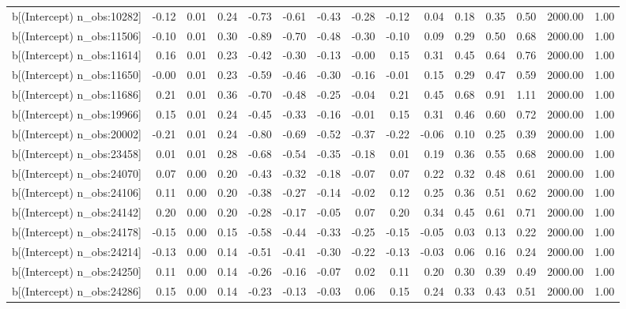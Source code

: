 \begin{table}[ht]
\begin{tabular}{rrrrrrrrrrrrrrr}
  b[(Intercept) n\_obs:10282] & -0.12 & 0.01 & 0.24 & -0.73 & -0.61 & -0.43 & -0.28 & -0.12 & 0.04 & 0.18 & 0.35 & 0.50 & 2000.00 & 1.00 \\ 
  b[(Intercept) n\_obs:11506] & -0.10 & 0.01 & 0.30 & -0.89 & -0.70 & -0.48 & -0.30 & -0.10 & 0.09 & 0.29 & 0.50 & 0.68 & 2000.00 & 1.00 \\ 
  b[(Intercept) n\_obs:11614] & 0.16 & 0.01 & 0.23 & -0.42 & -0.30 & -0.13 & -0.00 & 0.15 & 0.31 & 0.45 & 0.64 & 0.76 & 2000.00 & 1.00 \\ 
  b[(Intercept) n\_obs:11650] & -0.00 & 0.01 & 0.23 & -0.59 & -0.46 & -0.30 & -0.16 & -0.01 & 0.15 & 0.29 & 0.47 & 0.59 & 2000.00 & 1.00 \\ 
  b[(Intercept) n\_obs:11686] & 0.21 & 0.01 & 0.36 & -0.70 & -0.48 & -0.25 & -0.04 & 0.21 & 0.45 & 0.68 & 0.91 & 1.11 & 2000.00 & 1.00 \\ 
  b[(Intercept) n\_obs:19966] & 0.15 & 0.01 & 0.24 & -0.45 & -0.33 & -0.16 & -0.01 & 0.15 & 0.31 & 0.46 & 0.60 & 0.72 & 2000.00 & 1.00 \\ 
  b[(Intercept) n\_obs:20002] & -0.21 & 0.01 & 0.24 & -0.80 & -0.69 & -0.52 & -0.37 & -0.22 & -0.06 & 0.10 & 0.25 & 0.39 & 2000.00 & 1.00 \\ 
  b[(Intercept) n\_obs:23458] & 0.01 & 0.01 & 0.28 & -0.68 & -0.54 & -0.35 & -0.18 & 0.01 & 0.19 & 0.36 & 0.55 & 0.68 & 2000.00 & 1.00 \\ 
  b[(Intercept) n\_obs:24070] & 0.07 & 0.00 & 0.20 & -0.43 & -0.32 & -0.18 & -0.07 & 0.07 & 0.22 & 0.32 & 0.48 & 0.61 & 2000.00 & 1.00 \\ 
  b[(Intercept) n\_obs:24106] & 0.11 & 0.00 & 0.20 & -0.38 & -0.27 & -0.14 & -0.02 & 0.12 & 0.25 & 0.36 & 0.51 & 0.62 & 2000.00 & 1.00 \\ 
  b[(Intercept) n\_obs:24142] & 0.20 & 0.00 & 0.20 & -0.28 & -0.17 & -0.05 & 0.07 & 0.20 & 0.34 & 0.45 & 0.61 & 0.71 & 2000.00 & 1.00 \\ 
  b[(Intercept) n\_obs:24178] & -0.15 & 0.00 & 0.15 & -0.58 & -0.44 & -0.33 & -0.25 & -0.15 & -0.05 & 0.03 & 0.13 & 0.22 & 2000.00 & 1.00 \\ 
  b[(Intercept) n\_obs:24214] & -0.13 & 0.00 & 0.14 & -0.51 & -0.41 & -0.30 & -0.22 & -0.13 & -0.03 & 0.06 & 0.16 & 0.24 & 2000.00 & 1.00 \\ 
  b[(Intercept) n\_obs:24250] & 0.11 & 0.00 & 0.14 & -0.26 & -0.16 & -0.07 & 0.02 & 0.11 & 0.20 & 0.30 & 0.39 & 0.49 & 2000.00 & 1.00 \\ 
  b[(Intercept) n\_obs:24286] & 0.15 & 0.00 & 0.14 & -0.23 & -0.13 & -0.03 & 0.06 & 0.15 & 0.24 & 0.33 & 0.43 & 0.51 & 2000.00 & 1.00 \\ 

\end{tabular}
\end{table}
